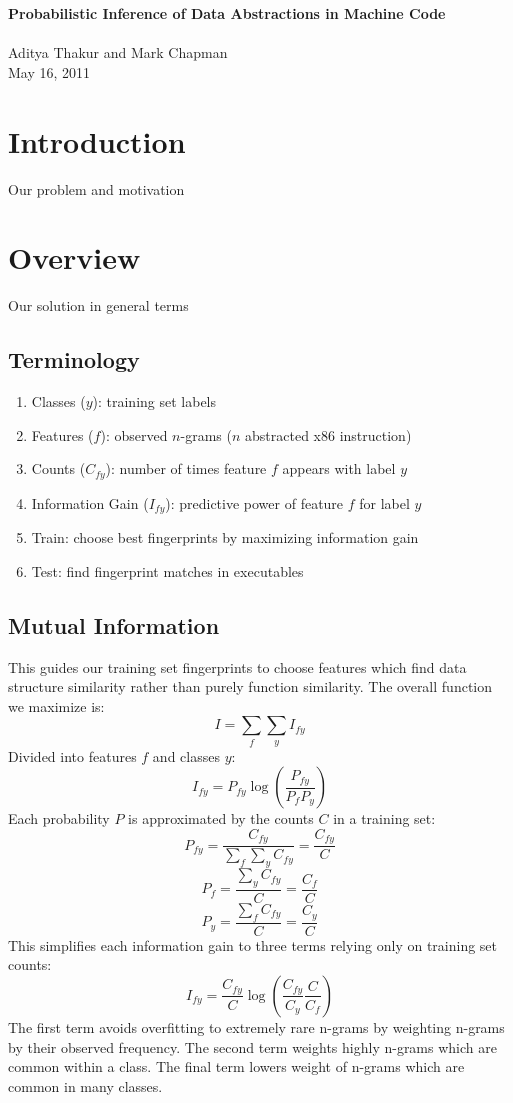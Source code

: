 \documentclass[12pt]{article}
\begin{document}
\begin{center}

\textbf{Probabilistic Inference of Data Abstractions in Machine Code \\ ~\\}
Aditya Thakur and Mark Chapman \\ May 16, 2011

\end{center}

\section{Introduction}

Our problem and motivation

\section{Overview}

Our solution in general terms

\subsection*{Terminology}

\begin{enumerate}
 \item Classes ($y$): training set labels
 \item Features ($f$): observed $n$-grams ($n$ abstracted x86 instruction)
 \item Counts ($C_{fy}$): number of times feature $f$ appears with label $y$
 \item Information Gain ($I_{fy}$): predictive power of feature $f$ for label $y$
 \item Train: choose best fingerprints by maximizing information gain
 \item Test: find fingerprint matches in executables
\end{enumerate}

\subsection*{Mutual Information}

This guides our training set fingerprints to choose features which
find data structure similarity rather than purely function similarity.
The overall function we maximize is:
\[ I = \sum_f \sum_y I_{fy} \]
Divided into features $f$ and classes $y$:
\[ I_{fy} = P_{fy} \log ( \frac{ P_{fy} }{ P_f P_y } ) \]
Each probability $P$ is approximated by the counts $C$ in a training
set:
\[ P_{fy} = \frac{ C_{fy} }{ \sum_f \sum_y C_{fy} } = \frac{ C_{fy} }{ C } \]
\[ P_f = \frac{ \sum_y C_{fy} }{ C } = \frac{ C_f }{ C } \]
\[ P_y = \frac{ \sum_f C_{fy} }{ C } = \frac{ C_y }{ C } \]
This simplifies each information gain to three terms relying only on
training set counts:
\[ I_{fy} = \frac{ C_{fy} }{ C } \log ( \frac{ C_{fy} }{ C_y } \frac{ C }{ C_f } ) \]
The first term avoids overfitting to extremely rare n-grams by
weighting n-grams by their observed frequency.  The second term
weights highly n-grams which are common within a class.  The final
term lowers weight of n-grams which are common in many classes.
\end{document}
